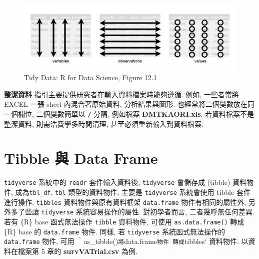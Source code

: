\documentclass[
]{book}
\begin{document}
\begin{figure}
\centering
\includegraphics{./images/tidydata.png}
\caption{Tidy Data: R for Data Science, Figure 12.1}
\end{figure}

\textbf{整潔資料} 指引主要提供研究者在輸入資料檔案時能夠遵循.
例如, 一些者常將 EXCEL 一張 sheel 內混合著原始資料, 分析結果與圖形.
也經常將二個變數放在同一個欄位, 二個變數簡單以 \texttt{/} 分隔.
例如檔案 \textbf{DMTKAORI.xls}.
若資料檔案不是整潔資料, 則需浩費學多時間清理, 甚至必須重新輸入到資料檔案.

\hypertarget{tibble-ux8207-data-frame}{%
\section{Tibble 與 Data Frame}\label{tibble-ux8207-data-frame}}

\texttt{tidyverse} 系統中的 \texttt{readr} 套件輸入資料後,
\texttt{tidyverse} 會儲存成 (tibble) 資料物件,
成為\texttt{tbl\_df}, \texttt{tbl} 類型的資料物件,
主要是 \texttt{tidyverse} 系統會使用 tibble 套件進行操作.
\texttt{tibbles} 資料物件與原有資料框架 \texttt{data.frame} 物件有相同的屬性外,
另外多了些讓 \texttt{tidyverse} 系統容易操作的屬性.
對初學者而言, 二者幾呼無任何差異.
若有 \{R\} base 函式無法操作 \texttt{tibble} 資料物件,
可使用 \texttt{as.data.frame()}
轉成 \{R\} base 的 \texttt{data.frame} 物件.
同樣, 若 \texttt{tidyverse} 系統函式無法操作的 \texttt{data.frame} 物件,
可用 ‵as\_tibble()\texttt{將}data.frame\texttt{物件\ 轉成}tibbles` 資料物件.
以資料在檔案第 5 章的 \textbf{survVATrial.csv} 為例.
\end{document}

